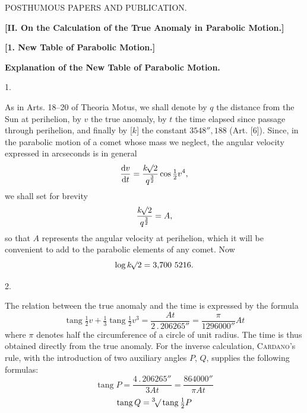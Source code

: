 \clearpage
{}
\begin{center}
{\large POSTHUMOUS PAPERS AND PUBLICATION.\par}
\bigskip
{}
\textbf{[II. On the Calculation of the True Anomaly in Parabolic Motion.]}\par
\bigskip
{}
\textbf{[1. New Table of Parabolic Motion.]}\par
\medskip
\textbf{Explanation of the New Table of Parabolic Motion.}
\end{center}
\medskip
{}
\begin{center}1.\end{center}
\noindent\hspace*{\parindent}As in Arts. 18–20 of Theoria Motus, we shall denote by \(q\) the distance from the Sun at perihelion, by \(v\) the true anomaly, by \(t\) the time elapsed since passage through perihelion, and finally by [\(k\)] the constant \(3548''{,}188\) (Art. [6]). Since, in the parabolic motion of a comet whose mass we neglect, the angular velocity expressed in arcseconds is in general
\[
\frac{\mathrm{d}v}{\mathrm{d}t}=\frac{k\BareRoot{2}}{q^{\frac32}}\cos\tfrac12v^4,
\]
we shall set for brevity
\[
\frac{k\BareRoot{2}}{q^{\frac32}}=A,
\]
so that \(A\) represents the angular velocity at perihelion, which it will be convenient to add to the parabolic elements of any comet. Now
\[
\log k\BareRoot{2}=3{,}700\ 5216.
\]
\par\medskip
{}
\begin{center}2.\end{center}
\noindent\hspace*{\parindent}The relation between the true anomaly and the time is expressed by the formula
\[
\operatorname{tang}\tfrac12v+\tfrac13\operatorname{tang}\tfrac12v^3
=\frac{At}{2\mathpunct{.}206265''}=\frac{\pi}{1296000''}At
\]
where \(\pi\) denotes half the circumference of a circle of unit radius. The time is thus obtained directly from the true anomaly. For the inverse calculation, \textsc{Cardano}'s rule, with the introduction of two auxiliary angles \(P\), \(Q\), supplies the following formulas:
\[
\operatorname{tang}P=\frac{4\mathpunct{.}206265''}{3At}=\frac{864000''}{\pi At}
\]
\[
\operatorname{tang}Q=\BareRoot[3]{\operatorname{tang}\tfrac12P}
\]
